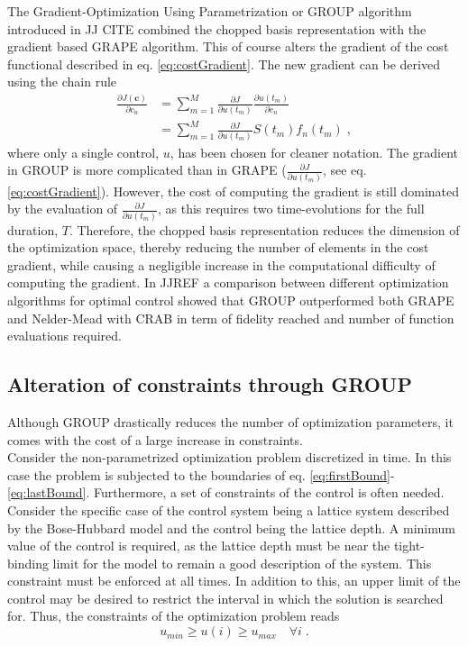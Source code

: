 The Gradient-Optimization Using Parametrization or \textsc{GROUP} algorithm introduced in JJ CITE combined the chopped basis representation with the gradient based \textsc{GRAPE} algorithm. This of course alters the gradient of the cost functional described in eq. \eqref{eq:costGradient}. The new gradient can be derived using the chain rule
\begin{align}
	\frac{\partial J (\boldsymbol{c})}{\partial c_n} &= \sum_{m = 1}^{M} \frac{\partial J }{\partial u(t_m)} \frac{\partial u(t_m)}{\partial c_n} \nonumber \\
	&= \sum_{m = 1}^{M} \frac{\partial J }{\partial u(t_m)} S(t_m) f_n(t_m) \; , \label{eq:GROUPgradient} 
\end{align}
where only a single control, $u$, has been chosen for cleaner notation. The gradient in \textsc{GROUP} is more complicated than in \textsc{GRAPE} ($\frac{\partial J }{\partial u(t_m)}$, see eq. \eqref{eq:costGradient}). However, the cost of computing the gradient is still dominated by the evaluation of $\frac{\partial J }{\partial u(t_m)}$, as this requires two time-evolutions for the full duration, $T$. Therefore, the chopped basis representation reduces the dimension of the optimization space, thereby reducing the number of elements in the cost gradient, while causing a negligible increase in the computational difficulty of computing the gradient.
In JJREF a comparison between different optimization algorithms for optimal control showed that \textsc{GROUP} outperformed both \textsc{GRAPE} and Nelder-Mead with \textsc{CRAB} in term of fidelity reached and number of function evaluations required.

\subsection{Alteration of constraints through GROUP}
Although GROUP drastically reduces the number of optimization parameters, it comes with the cost of a large increase in constraints.\\
Consider the non-parametrized optimization problem discretized in time. In this case the problem is subjected to the boundaries of eq. \eqref{eq:firstBound}-\eqref{eq:lastBound}. Furthermore, a set of constraints of the control is often needed. Consider the specific case of the control system being a lattice system described by the Bose-Hubbard model and the control being the lattice depth. A minimum value of the control is required, as the lattice depth must be near the tight-binding limit for the model to remain a good description of the system. This constraint must be enforced at all times. In addition to this, an upper limit of the control may be desired to restrict the interval in which the solution is searched for. Thus, the constraints of the optimization problem reads 
\begin{equation}
	 u_{min} \geq u(i) \geq u_{max} \quad \forall i \; .
\end{equation}

